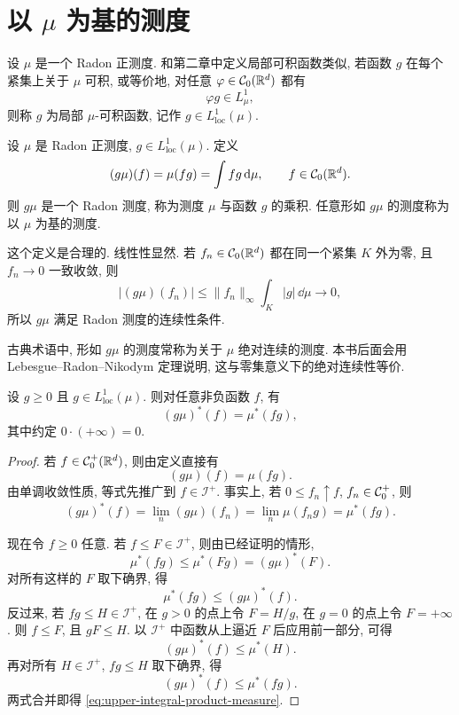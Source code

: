 \clearpage

\section{以 \texorpdfstring{\(\mu\)}{mu} 为基的测度}
\label{sec:measures-with-base-mu}

设 \(\mu\) 是一个 Radon 正测度. 和第二章中定义局部可积函数类似, 若函数 \(g\) 在每个紧集上关于 \(\mu\) 可积, 或等价地, 对任意 \(\varphi\in\mathcal{C}_0(\mathbb{R}^d)\) 都有
\[
\varphi g\in L^1_\mu,
\]
则称 \(g\) 为局部 \(\mu\)-可积函数, 记作 \(g\in L^1_{\operatorname{loc}}(\mu)\).

\begin{defn}[以 \(\mu\) 为基的测度]
	\label{def:measure-with-base-mu}
	设 \(\mu\) 是 Radon 正测度, \(g\in L^1_{\operatorname{loc}}(\mu)\). 定义
	\[
	(g\mu)(f)=\mu(fg)=\int f g\,\dd\mu,
	\qquad f\in\mathcal{C}_0(\mathbb{R}^d).
	\]
	则 \(g\mu\) 是一个 Radon 测度, 称为测度 \(\mu\) 与函数 \(g\) 的乘积. 任意形如 \(g\mu\) 的测度称为以 \(\mu\) 为基的测度.
\end{defn}

这个定义是合理的. 线性性显然. 若 \(f_n\in\mathcal{C}_0(\mathbb{R}^d)\) 都在同一个紧集 \(K\) 外为零, 且 \(f_n\to0\) 一致收敛, 则
\[
|(g\mu)(f_n)|\leq \|f_n\|_\infty\int_K |g|\,\dd\mu\to0,
\]
所以 \(g\mu\) 满足 Radon 测度的连续性条件.

\begin{rem}
	古典术语中, 形如 \(g\mu\) 的测度常称为关于 \(\mu\) 绝对连续的测度. 本书后面会用 Lebesgue--Radon--Nikodym 定理说明, 这与零集意义下的绝对连续性等价.
\end{rem}

\begin{lem}\label{lem:upper-integral-product-measure}
	设 \(g\geq0\) 且 \(g\in L^1_{\operatorname{loc}}(\mu)\). 则对任意非负函数 \(f\), 有
	\begin{equation}
		(g\mu)^*(f)=\mu^*(fg),
		\label{eq:upper-integral-product-measure}
	\end{equation}
	其中约定 \(0\cdot(+\infty)=0\).
\end{lem}

\begin{proof}
	若 \(f\in\mathcal{C}_0^+(\mathbb{R}^d)\), 则由定义直接有
	\[
	(g\mu)(f)=\mu(fg).
	\]
	由单调收敛性质, 等式先推广到 \(f\in\mathcal I^+\). 事实上, 若 \(0\leq f_n\uparrow f\), \(f_n\in\mathcal{C}_0^+\), 则
	\[
	(g\mu)^*(f)=\lim_n (g\mu)(f_n)
	=\lim_n \mu(f_n g)=\mu^*(fg).
	\]
	
	现在令 \(f\geq0\) 任意. 若 \(f\leq F\in\mathcal I^+\), 则由已经证明的情形,
	\[
	\mu^*(fg)\leq \mu^*(Fg)=(g\mu)^*(F).
	\]
	对所有这样的 \(F\) 取下确界, 得
	\[
	\mu^*(fg)\leq (g\mu)^*(f).
	\]
	反过来, 若 \(fg\leq H\in\mathcal I^+\), 在 \(g>0\) 的点上令 \(F=H/g\), 在 \(g=0\) 的点上令 \(F=+\infty\). 则 \(f\leq F\), 且 \(gF\leq H\). 以 \(\mathcal I^+\) 中函数从上逼近 \(F\) 后应用前一部分, 可得
	\[
	(g\mu)^*(f)\leq \mu^*(H).
	\]
	再对所有 \(H\in\mathcal I^+\), \(fg\leq H\) 取下确界, 得
	\[
	(g\mu)^*(f)\leq \mu^*(fg).
	\]
	两式合并即得 \eqref{eq:upper-integral-product-measure}.
\end{proof}

